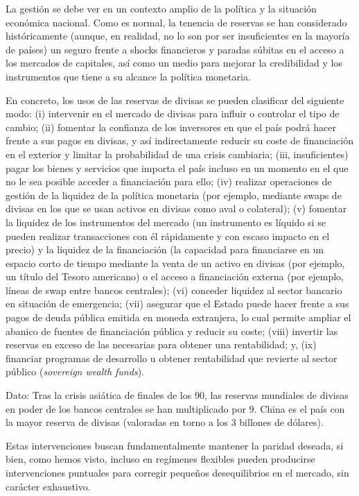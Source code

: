 \documentclass[10pt,a4paper]{article}
\begin{document}
La gestión se debe ver en un contexto amplio de la política y la situación económica nacional. Como es normal, la tenencia de reservas se han considerado históricamente (aunque, en realidad, no lo son por ser insuficientes en la mayoría de países) un seguro frente a shocks financieros y paradas súbitas en el acceso a los mercados de capitales, así como un medio para mejorar la credibilidad y los instrumentos que tiene a su alcance la política monetaria. 

En concreto, los usos de las reservas de divisas se pueden clasificar del siguiente modo: (i) intervenir en el mercado de divisas para influir o controlar el tipo de cambio; (ii) fomentar la confianza de los inversores en que el país podrá hacer frente a sus pagos en divisas, y así indirectamente reducir su coste de financiación en el exterior y limitar la probabilidad de una crisis cambiaria; (iii, insuficientes) pagar los bienes y servicios que importa el país incluso en un momento en el que no le sea posible acceder a financiación para ello; (iv) realizar operaciones de gestión de la liquidez de la política monetaria (por ejemplo, mediante swaps de divisas en los que se usan activos en divisas como aval o colateral); (v) fomentar la liquidez de los instrumentos del mercado (un instrumento es líquido si se pueden realizar transacciones con él rápidamente y con escaso impacto en el precio) y la liquidez de la financiación (la capacidad para financiarse en un espacio corto de tiempo mediante la venta de un activo en divisas (por ejemplo, un título del Tesoro americano) o el acceso a financiación externa (por ejemplo, líneas de swap entre bancos centrales); (vi) conceder liquidez al sector bancario en situación de emergencia; (vii) asegurar que el Estado puede hacer frente a sus pagos de deuda pública emitida en moneda extranjera, lo cual permite ampliar el abanico de fuentes de financiación pública y reducir su coste; (viii) invertir las reservas en exceso de las necesarias para obtener una rentabilidad; y, (ix) financiar programas de desarrollo u obtener rentabilidad que revierte al sector público (\textit{sovereign wealth funds}).

Dato: Tras la crisis asiática de finales de los 90, las reservas mundiales de divisas en poder de los bancos centrales se han multiplicado por 9. China es el país con la mayor reserva de divisas (valoradas en torno a los 3 billones de dólares).

Estas intervenciones buscan fundamentalmente mantener la paridad deseada, si bien, como hemos visto, incluso en regímenes flexibles pueden producirse intervenciones puntuales para corregir pequeños desequilibrios en el mercado, sin carácter exhaustivo.
\end{document}
